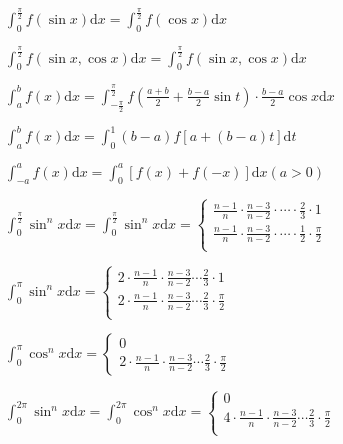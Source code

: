 \begin{spacing}{3}
    \noindent $\displaystyle \int_{0}^{\frac{\pi}{2}}{f(\sin{x})}\mathrm{d}x = \int_{0}^{\frac{\pi}{2}}{f(\cos{x})}\mathrm{d}x $

    \noindent $\displaystyle \int_{0}^{\frac{\pi}{2}}{f(\sin{x}, \cos{x})}\mathrm{d}x = \int_{0}^{\frac{\pi}{2}}{f(\sin{x}, \cos{x})}\mathrm{d}x $

    \noindent $\displaystyle \int_{a}^{b}{f(x)}\mathrm{d}x = \int_{-\frac{\pi}{2}}^{\frac{\pi}{2}}{f(\frac{a + b}{2} + \frac{b - a}{2}\sin{t}) \cdot \frac{b - a}{2}\cos{x}}\mathrm{d}x$

    \noindent $\displaystyle \int_{a}^{b}{f(x)}\mathrm{d}x = \int_{0}^{1}(b - a)f[a + (b - a)t]\mathrm{d}t$

    \noindent $\displaystyle \int_{-a}^{a}{f(x)}\mathrm{d}x = \int_{0}^{a}[f(x) + f(-x)]\mathrm{d}x (a > 0)$

    \noindent $\displaystyle \int_{0}^{ \frac{\pi}{2} } {\sin^n{x}} \mathrm{d}x = \int_{0}^{ \frac{\pi}{2} } {\sin^n{x}} \mathrm{d}x = \left\{
        \begin{array}{l}
            \frac{n - 1}{n} \cdot \frac{n - 3}{n - 2} \cdot \cdots  \cdot \frac{2}{3} \cdot 1 \\
            \frac{n - 1}{n} \cdot \frac{n - 3}{n - 2} \cdot \cdots  \cdot \frac{1}{2} \cdot \frac{\pi}{2} \\
        \end{array}
    \right.$

    \noindent $\displaystyle \int_{0}^{\pi}{\sin^n{x}}\mathrm{d}x = \left\{ \begin{array}{l}
        2 \cdot \frac{n - 1}{n} \cdot \frac{n - 3}{n - 2} \cdots \frac{2}{3} \cdot 1 \\
        2 \cdot \frac{n - 1}{n} \cdot \frac{n - 3}{n - 2} \cdots \frac{2}{3} \cdot \frac{\pi}{2} \\
    \end{array}\right.$

    \noindent $\displaystyle \int_{0}^{\pi}{\cos^n{x}}\mathrm{d}x = \left\{ \begin{array}{l}
        0 \\
        2 \cdot \frac{n - 1}{n} \cdot \frac{n - 3}{n - 2} \cdots \frac{2}{3} \cdot \frac{\pi}{2}
    \end{array}\right.$

    \noindent $\displaystyle \int_{0}^{2\pi}{\sin^n{x}}\mathrm{d}x = \int_{0}^{2\pi}{\cos^n{x}}\mathrm{d}x =
        \left\{ \begin{array}{l}
        0 \\
        4 \cdot \frac{n - 1}{n} \cdot \frac{n - 3}{n - 2} \cdots \frac{2}{3} \cdot \frac{\pi}{2} \\
    \end{array}\right. $
\end{spacing}
